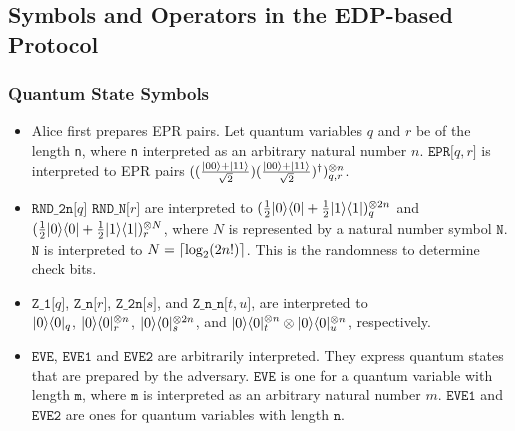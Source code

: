 \subsection{Symbols and Operators in the EDP-based Protocol}
\subsubsection{Quantum State Symbols}
\begin{itemize}
 \item Alice first prepares EPR pairs. Let quantum variables $q$ and $r$
       be of the length {\tt n}, where {\tt n} interpreted as an
       arbitrary natural number $n$. 
       $\texttt{EPR[}q,r\texttt{]}$ is interpreted to EPR pairs
       $((\frac{|00\rangle+|11\rangle}{\sqrt{2}})
       (\frac{|00\rangle+|11\rangle}{\sqrt{2}})^\dagger)^{\otimes
       n}_{q,r}$.
 \item $\texttt{RND\_2n[}q\texttt{]}$
       $\texttt{RND\_N[}r\texttt{]}$
       are interpreted to
       $(\frac{1}{2}|0\rangle\langle 0|+
       \frac{1}{2}|1\rangle\langle 1|)^{\otimes 2n}_{q}$ and
       $(\frac{1}{2}|0\rangle\langle 0|+
       \frac{1}{2}|1\rangle\langle 1|)^{\otimes N}_{r}$, where $N$
       is represented by a natural number symbol $\mathtt{N}$.
       $\mathtt{N}$ is interpreted to $N = \lceil \log_2(2n!) \rceil$.
       This is the randomness
       to determine check bits.
 \item $\texttt{Z\_1[}q\texttt{]}$,
       $\texttt{Z\_n[}r\texttt{]}$,
       $\texttt{Z\_2n[}s\texttt{]}$, and
       $\texttt{Z\_n\_n[}t,u\texttt{]}$,
       are interpreted to\\
       $|0\rangle\langle 0|_{q}$,
       $|0\rangle\langle 0|^{\otimes n}_{r}$,
       $|0\rangle\langle 0|^{\otimes 2n}_{s}$, and
       $|0\rangle\langle 0|^{\otimes n}_{t} \otimes |0\rangle\langle 0|^{\otimes n}_{u}$,
       respectively.
 \item $\texttt{EVE}$, $\texttt{EVE1}$ and $\texttt{EVE2}$ are
       arbitrarily interpreted. They express quantum states that are
       prepared by the adversary. $\texttt{EVE}$ is one for a quantum
       variable with length $\texttt{m}$, where $\texttt{m}$ is
       interpreted as an arbitrary natural number $m$. $\texttt{EVE1}$
       and $\texttt{EVE2}$ are ones for quantum variables with
       length $\texttt{n}$.
\end{itemize}

